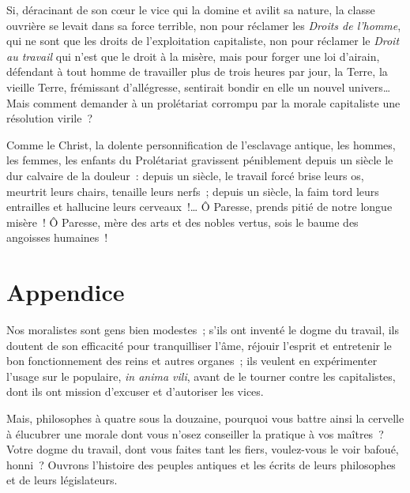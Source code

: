 \documentclass[french,twoside]{book} %
\newcommand\chapteropen{} %
\newcommand\chaptercont{} %
\newcommand\chapterclose{} %
\begin{document}
\noindent Si, déracinant de son cœur le vice qui la domine et avilit sa nature, la classe ouvrière se levait dans sa force terrible, non pour réclamer les \emph{Droits de l’homme}, qui ne sont que les droits de l’exploitation capitaliste, non pour réclamer le \emph{Droit au travail} qui n’est que le droit à la misère, mais pour forger une loi d’airain, défendant à tout homme de travailler plus de trois heures par jour, la Terre, la vieille Terre, frémissant d’allégresse, sentirait bondir en elle un nouvel univers… Mais comment demander à un prolétariat corrompu par la morale capitaliste une résolution virile ?\par
Comme le Christ, la dolente personnification de l’esclavage antique, les hommes, les femmes, les enfants du Prolétariat gravissent péniblement depuis un siècle le dur calvaire de la douleur : depuis un siècle, le travail forcé brise leurs os, meurtrit leurs chairs, tenaille leurs nerfs ; depuis un siècle, la faim tord leurs entrailles et hallucine leurs cerveaux !… Ô Paresse, prends pitié de notre longue misère ! Ô Paresse, mère des arts et des nobles vertus, sois le baume des angoisses humaines !
\chapterclose


\chapteropen
\chapter[{Appendice}]{Appendice}\renewcommand{\leftmark}{Appendice}


\chaptercont
\noindent Nos moralistes sont gens bien modestes ; s’ils ont inventé le dogme du travail, ils doutent de son efficacité pour tranquilliser l’âme, réjouir l’esprit et entretenir le bon fonctionnement des reins et autres organes ; ils veulent en expérimenter l’usage sur le populaire, \emph{in anima vili}, avant de le tourner contre les capitalistes, dont ils ont mission d’excuser et d’autoriser les vices.\par
Mais, philosophes à quatre sous la douzaine, pourquoi vous battre ainsi la cervelle à élucubrer une morale dont vous n’osez conseiller la pratique à vos maîtres ? Votre dogme du travail, dont vous faites tant les fiers, voulez-vous le voir bafoué, honni ? Ouvrons l’histoire des peuples antiques et les écrits de leurs philosophes et de leurs législateurs.\par
\end{document}
